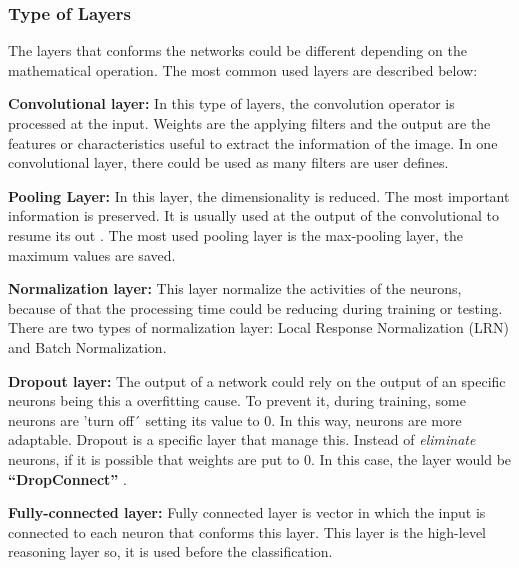 \subsubsection{Type of Layers}
The layers that conforms the networks could be different depending on the mathematical operation. The most common used layers are described below:
\begin{description}[noitemsep,topsep=8pt,parsep=0pt,partopsep=20pt]
	\item \textbf{Convolutional layer:} In this type of layers, the convolution operator is processed at the input. Weights are the applying filters and the output are the features or characteristics useful to extract the information of the image. In one convolutional layer, there could be used as many filters are user defines.
	\item \textbf{Pooling Layer:} In this layer, the dimensionality is reduced. The most important information is preserved. It is usually used at the output of the convolutional to resume its out \cite{Doorn}. The most used pooling layer is the max-pooling layer, the maximum values are saved.
	\item \textbf{Normalization layer:} This layer normalize the activities of the neurons, because of that the processing time could be reducing during training or testing. There are two types of normalization layer: Local Response Normalization (LRN) and Batch Normalization.
	\item \textbf{Dropout layer:} The output of a network could rely on the output of an specific neurons being this a overfitting cause. To prevent it, during training, some neurons are 'turn off´ setting its value to 0. In this way, neurons are more adaptable. Dropout is a specific layer that manage this. Instead of \textit{eliminate} neurons, if it is possible that weights are put to 0. In this case, the layer would be \textbf{``DropConnect''} \cite{Doorn}.
	\item  \textbf{Fully-connected layer:} Fully connected layer is vector in which the input is connected to each neuron that conforms this layer. This layer is the high-level reasoning layer so, it is used before the classification.
\end{description}

